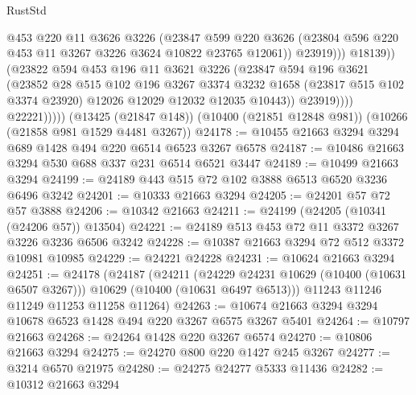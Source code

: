 \begin{lexlean}{RustStd}
\begin{coremodule}
{\begin{coremodule}
{{{{{{{{{{{{{{{{{{{{{{{{{                              @453
                              @220
                              @11
                              @3626
                              @3226
                              (@23847
                                @599
                                @220
                                @3626
                                (@23804 @596 @220 @453 @11 @3267 @3226 @3624 @10822 @23765 @12061))
                              @23919)))
                        @18139))
                    (@23822
                      @594
                      @453
                      @196
                      @11
                      @3621
                      @3226
                      (@23847
                        @594
                        @196
                        @3621
                        (@23852
                          @28
                          @515
                          @102
                          @196
                          @3267
                          @3374
                          @3232
                          @1658
                          (@23817 @515 @102 @3374 @23920)
                          @12026
                          @12029
                          @12032
                          @12035
                          @10443))
                      @23919))))
              @22221)))))
    (@13425 (@21847 @148))
    (@10400 (@21851 @12848 @981))
    (@10266 (@21858 @981 @1529 @4481 @3267))
@24178 := @10455 @21663 @3294 @3294 @689 @1428 @494 @220 @6514 @6523 @3267 @6578
@24187 := @10486 @21663 @3294 @530 @688 @337 @231 @6514 @6521 @3447
@24189 := @10499 @21663 @3294
@24199 := @24189 @443 @515 @72 @102 @3888 @6513 @6520 @3236 @6496 @3242
@24201 := @10333 @21663 @3294
@24205 := @24201 @57 @72 @57 @3888
@24206 := @10342 @21663
@24211 := @24199 (@24205 (@10341 (@24206 @57)) @13504)
@24221 := @24189 @513 @453 @72 @11 @3372 @3267 @3226 @3236 @6506 @3242
@24228 := @10387 @21663 @3294 @72 @512 @3372 @10981 @10985
@24229 := @24221 @24228
@24231 := @10624 @21663 @3294
@24251 := @24178
    (@24187
      (@24211
        (@24229 @24231 @10629 (@10400 (@10631 @6507 @3267)))
        @10629
        (@10400 (@10631 @6497 @6513)))
      @11243
      @11246
      @11249
      @11253
      @11258
      @11264)
@24263 := @10674 @21663 @3294 @3294 @10678 @6523 @1428 @494 @220 @3267 @6575 @3267 @5401
@24264 := @10797 @21663
@24268 := @24264 @1428 @220 @3267 @6574
@24270 := @10806 @21663 @3294
@24275 := @24270 @800 @220 @1427 @245 @3267
@24277 := @3214 @6570 @21975
@24280 := @24275 @24277 @5333 @11436
@24282 := @10312 @21663 @3294
}}}}}}}}}}}}}}}}}}}}}}}}}
\end{coremodule}}
\end{coremodule}
\end{lexlean}
